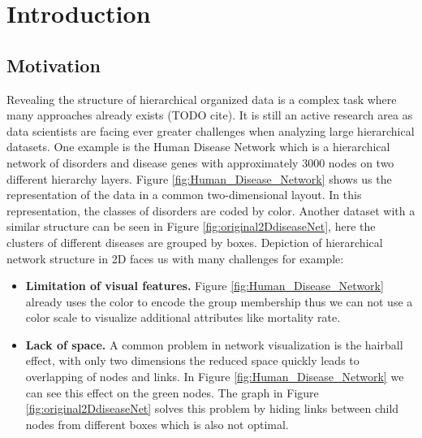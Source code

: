 \chapter{Introduction}

\section{Motivation}
Revealing the structure of hierarchical organized data is a complex task where many approaches already exists (TODO cite). It is still an active research area as data scientists are facing ever greater challenges when analyzing large hierarchical datasets. One example is the Human Disease Network \cite{zhou_human_2014} which is a hierarchical network of disorders and disease genes with approximately 3000 nodes on two different hierarchy layers. Figure \ref{fig:Human_Disease_Network} shows us the representation of the data in a common two-dimensional layout. In this representation, the classes of disorders are coded by color. 
Another dataset with a similar structure can be seen in Figure \ref{fig:original2DdiseaseNet}, here the clusters of different diseases are grouped by boxes. Depiction of hierarchical network structure in 2D faces us with many challenges for example: 
\begin{itemize}
    \item \textbf{Limitation of visual features.} Figure \ref{fig:Human_Disease_Network} already uses the color to encode the group membership thus we can not use a color scale to visualize additional attributes like mortality rate.
    \item \textbf{Lack of space.} A common problem in network visualization is the hairball effect, with only two dimensions the reduced space quickly leads to overlapping of nodes and links. In Figure \ref{fig:Human_Disease_Network} we can see this effect on the green nodes. The graph in Figure \ref{fig:original2DdiseaseNet} solves this problem by hiding links between child nodes from different boxes which is also not optimal.
\end{itemize} 

